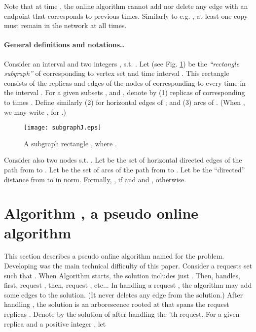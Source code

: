 \documentclass[11pt]{article}
\begin{document}
\noindent Note that at time , the online algorithm cannot add nor delete any edge with an endpoint that corresponds to previous times.
Similarly to e.g. \cite{MAicalp12,papa1,papa2,papa3,halperin},
at least one copy must remain in the network at all times.






\paragraph*{\bf General definitions and notations.\commsingle.\commsingleend}

Consider an interval 
and two integers , s.t. .
Let  (see Fig. \ref{figure:subgraphJ}) be the
{\em ``rectangle subgraph''} of  corresponding to vertex set  and time interval .
This rectangle consists of the
replicas and edges of the nodes of  corresponding to every time in the interval .
For a given subsets ,  and ,
denote by
(1)  replicas of  corresponding to times
 . Define similarly (2)  for horizontal edges of ; and (3)  arcs of .
(When , we may write
, for .)
\begin{figure}[http!]
\begin{center}
\texttt{[image: subgraphJ.eps]}
\end{center}
\caption{\sf \label{figure:subgraphJ}
A subgraph rectangle , where .}
\end{figure}
Consider also two nodes  s.t. .
Let 
be the set of horizontal directed edges of the  path from  to .
Let  be the set of arcs
of the path from  to .
Let  be the ``directed'' distance from  to  in  norm.
Formally, , if  and  and , otherwise.



\vspace{-0.0cm}


\vspace{-0.3cm}
\section{Algorithm , a pseudo online algorithm}
\label{sec:square}




This section describes a pseudo online algorithm named  for the  problem.
Developing  was the main technical difficulty of this paper.
Consider a requests set  such that .
When Algorithm  starts, the solution includes just .
Then,  handles, first, request , then, request , etc...
In handling a request , the algorithm
may add some edges to the solution.
(It never deletes any edge from the solution.)
After handling , the solution is an arborescence rooted at  that spans the request replicas .
Denote by  the solution of  after handling the 'th request.
For a given replica  and a positive integer ,
let
\vspace{-0.1cm}
\end{document}
